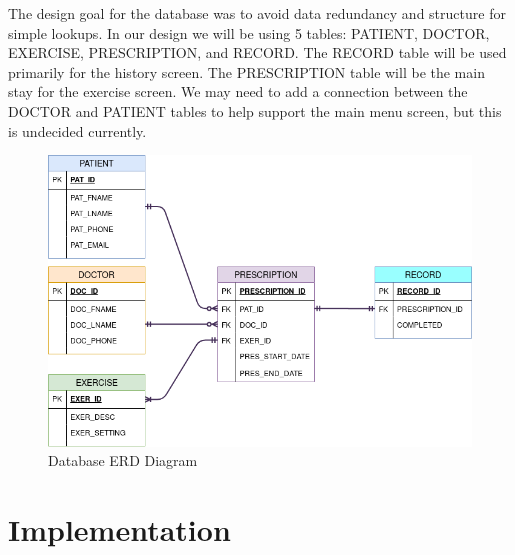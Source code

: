 \documentclass[a4paper,10pt]{article}
\begin{document}
            The design goal for the database was to avoid data redundancy and structure for simple lookups. In our design we will be using 5 tables: PATIENT, DOCTOR, EXERCISE, PRESCRIPTION, and RECORD. The RECORD table will be used primarily for the history screen. The PRESCRIPTION table will be the main stay for the exercise screen. We may need to add a connection between the DOCTOR and PATIENT tables to help support the main menu screen, but this is undecided currently. 
            
            \begin{figure}[h]
            \centering
            \includegraphics[width=140mm, scale=1]{databaseDiagram}
            \caption{Database ERD Diagram}
            \end{figure}
            

\section{Implementation}
\end{document}
